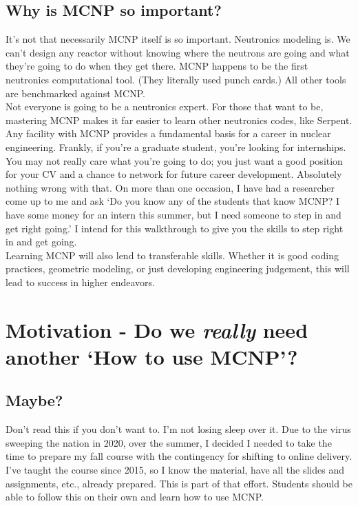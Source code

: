 \documentclass[11pt,a4paper]{article}
\begin{document}
\subsection{Why is MCNP so important?}
\noindent It's not that necessarily MCNP itself is so important. Neutronics modeling is. We can't design any reactor without knowing where the neutrons are going and what they're going to do when they get there. MCNP happens to be the first neutronics computational tool. (They literally used punch cards.) All other tools are benchmarked against MCNP.\\

\noindent Not everyone is going to be a neutronics expert. For those that want to be, mastering MCNP makes it far easier to learn other neutronics codes, like Serpent. Any facility with MCNP provides a fundamental basis for a career in nuclear engineering. Frankly, if you're a graduate student, you're looking for internships. You may not really care what you're going to do; you just want a good position for your CV and a chance to network for future career development. Absolutely nothing wrong with that. On more than one occasion, I have had a researcher come up to me and ask `Do you know any of the students that know MCNP? I have some money for an intern this summer, but I need someone to step in and get right going.' I intend for this walkthrough to give you the skills to step right in and get going.\\

\noindent Learning MCNP will also lend to transferable skills. Whether it is good coding practices, geometric modeling, or just developing engineering judgement, this will lead to success in higher endeavors. \\

\newpage


\section{Motivation - Do we \textit{really }need another `How to use MCNP'?} \label{motivation}
\subsection{Maybe?}
\noindent Don't read this if you don't want to. I'm not losing sleep over it. Due to the virus sweeping the nation in 2020, over the summer, I decided I needed to take the time to prepare my fall course with the contingency for shifting to online delivery. I've taught the course since 2015, so I know the material, have all the slides and assignments, etc., already prepared. This is part of that effort. Students should be able to follow this on their own and learn how to use MCNP. 
\end{document}
